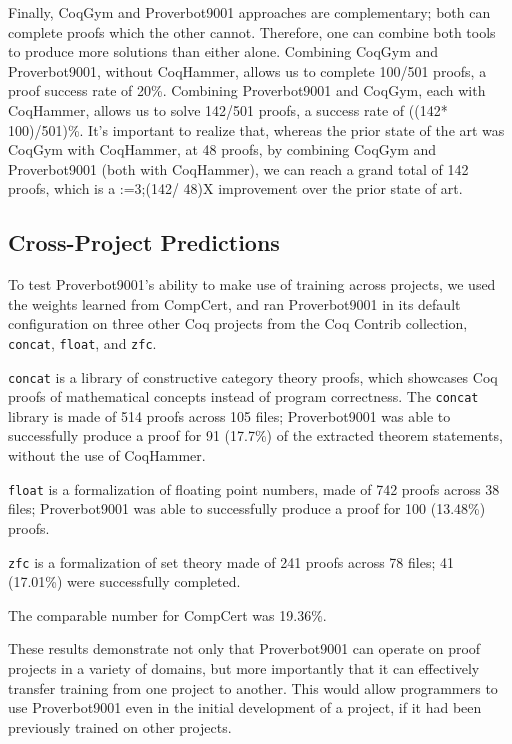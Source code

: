 \documentclass[sigplan,screen]{acmart}
\newcommand{\name}{Proverbot9001\xspace}
\newcommand{\CHCP}{142}
\renewcommand{\>}{\quad}
\begin{document}
Finally, CoqGym and \name{} approaches are complementary;
  both can complete proofs which the other cannot.
Therefore, one can combine both tools to produce
  more solutions than either alone.
Combining CoqGym and \name{}, without CoqHammer, allows us to complete 100/501 proofs,
  a proof success rate of 20\%.
Combining \name{} and CoqGym, each with CoqHammer,
  allows us to solve \CHCP{}/501 proofs, a success rate of \number\numexpr((\CHCP * 100)/501)\relax\%.
It's important to realize that,
  whereas the prior state of the art was CoqGym with CoqHammer, at 48 proofs,
  by combining CoqGym and \name{} (both with CoqHammer),
  we can reach a grand total of \CHCP\xspace proofs,
  which is a \xintDigits:=3;\xintthefloatexpr(\CHCP / 48)\relax X improvement
  over the prior state of art.

\subsection{Cross-Project Predictions}
\label{ssec:cross}

To test Proverbot9001's ability to make use of training across projects,
  we used the weights learned from CompCert,
  and ran Proverbot9001 in its default configuration
  on three other Coq projects from the Coq Contrib collection,
  \texttt{concat}, \texttt{float}, and \texttt{zfc}.

\texttt{concat} is a library of constructive category theory proofs,
  which showcases Coq proofs of mathematical concepts instead of program correctness.
The \texttt{concat} library is made of 514 proofs across 105 files;
Proverbot9001 was able to successfully produce a proof for 91 (17.7\%)
  of the extracted theorem statements,
  without the use of CoqHammer.

\texttt{float} is a formalization of floating point numbers, made of 742 proofs across 38 files;
  Proverbot9001 was able to successfully produce a proof for 100 (13.48\%) proofs.

\texttt{zfc} is a formalization of set theory made of 241 proofs across 78 files;
  41 (17.01\%) were successfully completed.

The comparable number for CompCert was 19.36\%.

These results demonstrate
  not only that Proverbot9001 can operate on proof projects in a variety of domains,
  but more importantly that it can effectively transfer training
  from one project to another.
This would allow programmers to use Proverbot9001
  even in the initial development of a project,
  if it had been previously trained on other projects.
\end{document}
